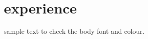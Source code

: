 \documentclass[12pt]{curriculum-vitae}
\begin{document}
\maketitle

\section{experience}

sample text to check the body font and colour.
\end{document}
